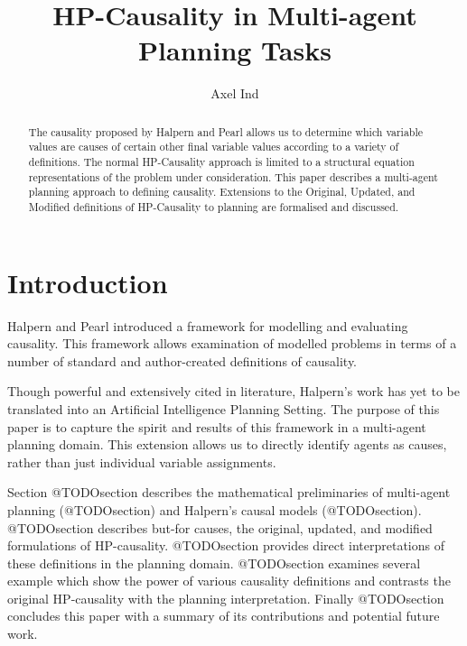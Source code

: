 \documentclass{article}
\theoremstyle{plain}
\theoremstyle{definition}
\begin{document}
\title{HP-Causality in Multi-agent Planning Tasks}
\author{Axel Ind}

\maketitle

\begin{abstract}
The causality proposed by Halpern and Pearl \cite{halpern2005causes} allows us to determine which variable values are causes of certain other final variable values according to a variety of definitions. The normal HP-Causality approach is limited to a structural equation representations of the problem under consideration. This paper describes a multi-agent planning approach to defining causality. Extensions to the Original, Updated, and Modified definitions of HP-Causality to planning are formalised and discussed.
\end{abstract}

\section{Introduction}

Halpern and Pearl \cite{halpern2005causes} introduced a framework for modelling and evaluating causality. This framework allows examination of modelled problems in terms of a number of standard and author-created definitions of causality.

Though powerful and extensively cited in literature, Halpern's work has yet to be translated into an Artificial Intelligence Planning Setting. The purpose of this paper is to capture the spirit and results of this framework in a multi-agent planning domain. This extension allows us to directly identify agents as causes, rather than just individual variable assignments.

Section @TODOsection describes the mathematical preliminaries of multi-agent planning (@TODOsection) and Halpern's causal models (@TODOsection). @TODOsection describes but-for causes, the original, updated, and modified formulations of HP-causality. @TODOsection provides direct interpretations of these definitions in the planning domain. @TODOsection examines several example which show the power of various causality definitions and contrasts the original HP-causality with the planning interpretation. Finally @TODOsection concludes this paper with a summary of its contributions and potential future work.
\end{document}
